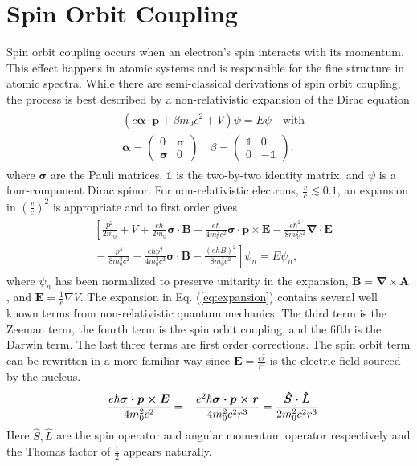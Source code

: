 \documentclass[12pt]{article}
\newcommand{\newln}{\\&{}}
\begin{document}
\section{Spin Orbit Coupling}
Spin orbit coupling occurs when an electron's spin interacts with its momentum.
This effect happens in atomic systems and is responsible for the fine structure in atomic spectra.
While there are semi-classical derivations of spin orbit coupling, the process is best described by a non-relativistic expansion of the Dirac equation\cite{Winkler}
\begin{align}\begin{split}
  \label{eq:Dirac}
  & (c\boldsymbol{\alpha\cdot p}+\beta m_{0}c^2+V)\psi=E\psi \quad\text{with}\newln\boldsymbol{\alpha}=\left(\begin{array}{cc} 0 & \boldsymbol{\sigma} \\ \boldsymbol{\sigma} & 0 \end{array} \right) \quad \beta=\left(\begin{array}{cc} \mathbb{1} & 0 \\ 0 & -\mathbb{1} \end{array} \right)\text{.}
\end{split}\end{align}
where $\boldsymbol\sigma$ are the Pauli matrices, $\mathbb{1}$ is the two-by-two identity matrix, and $\psi$ is a four-component Dirac spinor.
For non-relativistic electrons, $\frac{v}{c}\lesssim 0.1$, an expansion in $(\frac{v}{c})^2$ is appropriate and  to first order gives
\begin{align}\begin{split}
  \label{eq:expansion}
& \left [ \frac{p^2}{2m_0}\right.+V+\frac{e\hbar}{2m_0}\boldsymbol{\sigma\cdot B}-\frac{e\hbar}{4m_0^2c^2}\boldsymbol{\sigma\cdot p \times E}-\frac{e\hbar^2}{8m_0^2c^2}\boldsymbol{\nabla\cdot E} \newln-\frac{p^4}{8m_0^3c^2}-\frac{e\hbar p^2}{4m_0^3c^2}\boldsymbol{\sigma \cdot B}-\left.\frac{(ehB)^2}{8m_0^3c^2}\right]\psi_n=E\psi_n\text{,}
\end{split}\end{align}
where $\psi_n$ has been normalized to preserve unitarity in the expansion, $\boldsymbol{B}=\boldsymbol{\nabla}\times\boldsymbol{A}$, and $\boldsymbol{E}=\frac{1}{e}\nabla V$.
The expansion in Eq. (\ref{eq:expansion}) contains several well known terms from non-relativistic quantum mechanics.
The third term is the Zeeman term, the fourth term is the spin orbit coupling, and the fifth is the Darwin term.
The last three terms are first order corrections.
The spin orbit term can be rewritten in a more familiar way since $\boldsymbol{E}=\frac{e\hat{r}}{r^2}$ is the electric field sourced by the nucleus.
\begin{align}
  \label{eq:soc}
  -\frac{e\hbar\boldsymbol{\sigma\cdot p \times E}}{4m_0^2c^2}=-\frac{e^2\hbar\boldsymbol{\sigma\cdot p \times r}}{4m_0^2c^2r^3}\newline=\frac{\boldsymbol{\hat{S}\cdot \hat{L}}}{2m_0^2c^2r^3}
\end{align}
Here $\hat{S}, \hat{L}$ are the spin operator and angular momentum operator respectively and the Thomas factor of $\frac{1}{2}$ appears naturally.
\end{document}
